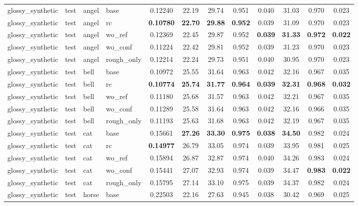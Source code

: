 \begin{table}[t]
{\begin{tabular}{llllcccccccc}
\midrule
glossy\_synthetic & test & angel & base & 0.12240 & 22.19 & 29.74 & 0.951 & 0.040 & 31.03 & 0.970 & 0.023 \\
glossy\_synthetic & test & angel & rc & \textbf{0.10780} & \textbf{22.70} & \textbf{29.88} & \textbf{0.952} & 0.039 & 31.09 & 0.970 & 0.023 \\
glossy\_synthetic & test & angel & wo\_ref & 0.12369 & 22.45 & 29.87 & 0.952 & \textbf{0.039} & \textbf{31.33} & \textbf{0.972} & \textbf{0.022} \\
glossy\_synthetic & test & angel & wo\_conf & 0.11224 & 22.42 & 29.81 & 0.952 & 0.039 & 31.23 & 0.970 & 0.023 \\
glossy\_synthetic & test & angel & rough\_only & 0.12214 & 22.24 & 29.73 & 0.951 & 0.040 & 30.95 & 0.970 & 0.023 \\
glossy\_synthetic & test & bell & base & 0.10972 & 25.55 & 31.64 & 0.963 & 0.042 & 32.16 & 0.967 & 0.035 \\
glossy\_synthetic & test & bell & rc & \textbf{0.10774} & \textbf{25.74} & \textbf{31.77} & \textbf{0.964} & \textbf{0.039} & \textbf{32.31} & \textbf{0.968} & \textbf{0.032} \\
glossy\_synthetic & test & bell & wo\_ref & 0.11180 & 25.68 & 31.57 & 0.963 & 0.042 & 32.21 & 0.967 & 0.035 \\
glossy\_synthetic & test & bell & wo\_conf & 0.11289 & 25.58 & 31.64 & 0.963 & 0.042 & 32.16 & 0.966 & 0.035 \\
glossy\_synthetic & test & bell & rough\_only & 0.11193 & 25.63 & 31.68 & 0.963 & 0.042 & 32.19 & 0.967 & 0.035 \\
glossy\_synthetic & test & cat & base & 0.15661 & \textbf{27.26} & \textbf{33.30} & \textbf{0.975} & \textbf{0.038} & \textbf{34.50} & 0.982 & 0.024 \\
glossy\_synthetic & test & cat & rc & \textbf{0.14977} & 26.79 & 33.05 & 0.974 & 0.039 & 33.95 & 0.981 & 0.025 \\
glossy\_synthetic & test & cat & wo\_ref & 0.15894 & 26.87 & 32.87 & 0.974 & 0.040 & 34.26 & 0.983 & 0.024 \\
glossy\_synthetic & test & cat & wo\_conf & 0.15441 & 27.07 & 32.93 & 0.974 & 0.039 & 34.47 & \textbf{0.983} & \textbf{0.022} \\
glossy\_synthetic & test & cat & rough\_only & 0.15795 & 27.14 & 33.10 & 0.975 & 0.039 & 34.37 & 0.982 & 0.024 \\
glossy\_synthetic & test & horse & base & 0.22503 & 22.16 & 27.63 & 0.945 & 0.038 & 30.42 & 0.969 & 0.025 \\

\end{tabular}}
\end{table}
